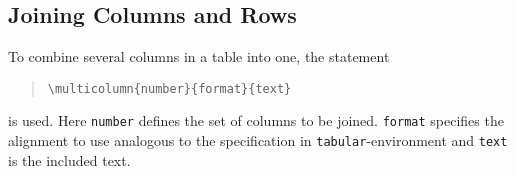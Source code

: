 

\subsection{Joining Columns and Rows}

To combine several columns in a table into one, the statement
%
\begin{quote}
    \verb!\multicolumn{number}{format}{text}!
\end{quote}
%
is used. Here \texttt{number} defines the set of columns to be joined.
\texttt{format} specifies the alignment to use analogous to the specification
in \texttt{tabular}-environment and \texttt{text} is the included text.

